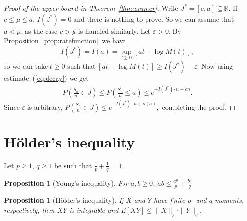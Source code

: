 \documentclass[12pt]{article}
\newtheorem{proposition}[equation]{Proposition}
\theoremstyle{definition}
\renewcommand{\P}{\mathbb{P}}
\newcommand{\R}{\mathbb{R}}
\renewcommand{\leq}{\leqslant}
\renewcommand{\ge}{\geqslant}
\renewcommand{\le}{\leqslant}
\renewcommand{\t}{t}
\renewcommand{\P}{P}
\begin{document}

\begin{proof}
[Proof of the upper bound in Theorem~\ref{thm:cramer}]
Write $J^*=[c,a] \subseteq \R$.
If $c \le \mu \le a$, $I(J^*)=0$ and there is nothing to prove.
So we can assume that $a<\mu$, as the case $c>\mu$ is handled similarly.
Let $\varepsilon>0$.
By Proposition~\ref{prop:ratefunction}, we have
\[
I(J^*)=I(a)=\sup_{\t \ge 0}[a\t - \log M(\t)]
,
\]
so we can take $\t \ge 0$ such that $[a\t - \log M(\t)]\ge I(J^*)-\varepsilon$.
Now using estimate~(\ref{eq:decay}) we get
\begin{align*}
\P\left( \tfrac{S_n}{n} \in J \right)
\le
\P\left( \tfrac{S_n}{n} \le a \right)
\le
e^{-I(J^*) \cdot n - \varepsilon n}
.
\end{align*}
Since $\varepsilon$ is arbitrary,
\(
\P\left( \tfrac{S_n}{n} \in J \right)
\le
e^{-I(J^*) \cdot n + o(n)}
,
\)
completing the proof.
\end{proof}

\section*{Hölder's inequality}

Let $p\ge 1$, $q\ge 1$ be such that $\frac{1}{p} + \frac{1}{q} = 1$.

\begin{proposition}
[Young's inequality]
For $a,b\ge 0$,
\(
\displaystyle
ab \le \frac{a^p}{p} + \frac{b^q}{q}
\)
\end{proposition}

\begin{proposition}
[Hölder's inequality]
If $X$ and $Y$ have finite $p$- and $q$-moments, respectively, then $XY$ is integrable and
\(
E[XY] \leq \|X\|_p \cdot \|Y\|_q
.
\)
\end{proposition}


\nocite{Gamarnik13}
\nocite{OlivieriVares05}
\nocite{DemboZeitouni10}



% 
\end{document}
